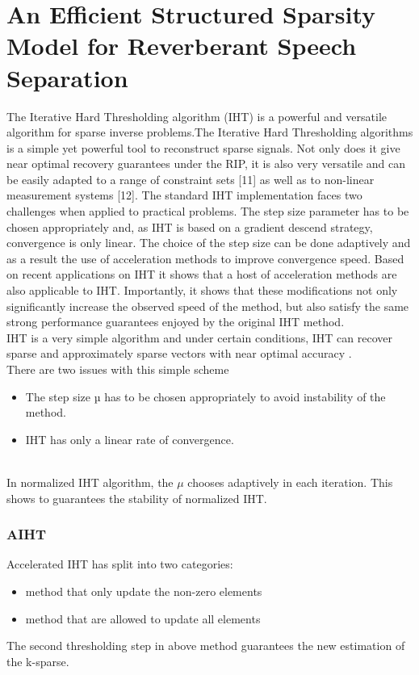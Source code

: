 \chapter{\textbf{An Efficient Structured Sparsity Model for Reverberant Speech Separation}}
\label{intro} 
\hspace *{0.9cm}The Iterative Hard Thresholding algorithm (IHT) is a powerful and versatile algorithm for sparse inverse problems.The Iterative Hard Thresholding algorithms is a simple yet powerful tool to reconstruct sparse signals. Not only does it give near optimal recovery guarantees under the RIP, it is also very versatile and can be easily adapted to a range of constraint sets [11] as well as to non-linear measurement systems [12]. The standard IHT implementation faces two challenges when applied to practical problems. The step size parameter has to be chosen appropriately and, as IHT is based on a gradient descend strategy, convergence is only linear. The choice of the step size can be done adaptively and as a result the use of acceleration methods to improve convergence speed. Based on recent applications on IHT it shows that a host of acceleration methods are also applicable to IHT. Importantly, it shows that these modifications not only significantly increase the observed speed of the method, but also satisfy the same strong performance guarantees enjoyed by the original IHT method.\\
IHT is a very simple algorithm and under certain conditions, IHT can recover sparse and approximately sparse vectors with near optimal accuracy .
\\
There are two issues with this simple scheme
\begin{itemize}
\item
The step size µ has to be chosen appropriately to avoid instability of the method.
\item
IHT has only a linear rate of convergence. 
\end{itemize}
\\
 In normalized IHT algorithm, the $ \mu $ chooses adaptively in each iteration. This shows to guarantees the stability of normalized IHT.
 \\
 \subsection{AIHT}
 Accelerated IHT has split into two categories:
 \begin{itemize}
 \item
 method that only update the non-zero elements
 \item
 method that are allowed to update all elements
 \end{itemize}
 The second thresholding step in above method guarantees the new estimation of the k-sparse.